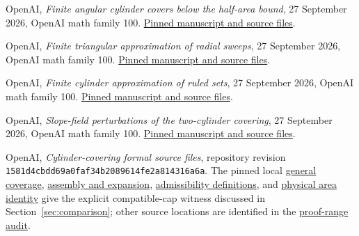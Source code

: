 \documentclass[11pt]{amsart}
\theoremstyle{definition}
\theoremstyle{remark}
\newcommand{\repo}[2]{\href{https://github.com/shjvandekamp/math/blob/main/topics/cylinder-covering/#1}{#2}}
\begin{document}
\begin{thebibliography}{99}
OpenAI,
\emph{Finite angular cylinder covers below the half-area bound},
27 September 2026, OpenAI math family 100.
\href{https://github.com/openai/math/tree/1581d4cbdd69a0faf34b2089614fe2a814316a6a/preprints/Finite-angular-cylinder-covers-below-the-half-area-bound-September-27-2026}{Pinned manuscript and source files}.

OpenAI,
\emph{Finite triangular approximation of radial sweeps},
27 September 2026, OpenAI math family 100.
\href{https://github.com/openai/math/tree/1581d4cbdd69a0faf34b2089614fe2a814316a6a/preprints/Finite-triangular-approximation-of-radial-sweeps-September-27-2026}{Pinned manuscript and source files}.

OpenAI,
\emph{Finite cylinder approximation of ruled sets},
27 September 2026, OpenAI math family 100.
\href{https://github.com/openai/math/tree/1581d4cbdd69a0faf34b2089614fe2a814316a6a/preprints/Finite-cylinder-approximation-of-ruled-sets-September-27-2026}{Pinned manuscript and source files}.

OpenAI,
\emph{Slope-field perturbations of the two-cylinder covering},
27 September 2026, OpenAI math family 100.
\href{https://github.com/openai/math/tree/1581d4cbdd69a0faf34b2089614fe2a814316a6a/preprints/Slope-field-perturbations-of-the-two-cylinder-covering-September-27-2026}{Pinned manuscript and source files}.

OpenAI,
\emph{Cylinder-covering formal source files},
repository revision\newline
\texttt{1581d4cbdd69a0faf34b2089614fe2a814316a6a}.
The pinned local
\repo{sources/lean/OAI/Geometry/CylinderCovering/Angular/GeneralCoverage.lean}{general coverage},
\repo{sources/lean/OAI/Geometry/CylinderCovering/Angular/GeneralAssembly.lean}{assembly and expansion},
\repo{sources/lean/OAI/Geometry/CylinderCovering/Angular/GeneralDefinitions.lean}{admissibility definitions},
and \repo{sources/lean/OAI/Geometry/CylinderCovering/Angular/GeneralVolume.lean}{physical area identity}
give the explicit compatible-cap witness discussed in
Section~\ref{sec:comparison}; other source locations are identified in the
\repo{research/published-proof-ranges.md}{proof-range audit}.
\end{thebibliography}
\end{document}
